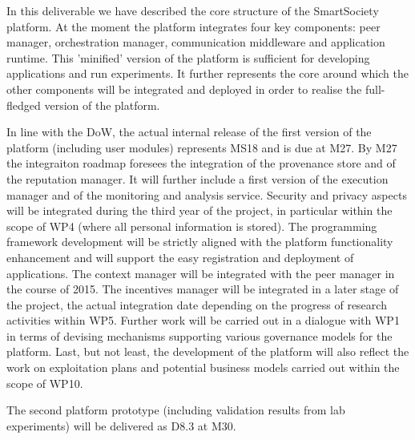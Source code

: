 In this deliverable we have described the core structure of the SmartSociety platform. At the moment the platform integrates four key components: peer manager, orchestration manager, communication middleware and application runtime. This 'minified' version of the platform is sufficient for developing applications and run experiments. It further represents the core around which the other components will be integrated and deployed in order to realise the full-fledged version of the platform. 

In line with the DoW, the actual internal release of the first version of the platform (including user modules) represents MS18 and is due at M27. By M27 the integraiton roadmap foresees the integration of the provenance store and of the reputation manager. It will further include a first version of the execution manager and of the monitoring and analysis service. Security and privacy aspects will be integrated during the third year of the project, in particular within the scope of WP4 (where all personal information is stored). The programming framework development will be strictly aligned with the platform functionality enhancement and will support the easy registration and deployment of applications. The context manager will be integrated with the peer manager in the course of 2015. The incentives manager will be integrated in a later stage of the project, the actual integration date depending on the progress of research activities within WP5. Further work will be carried out in a dialogue with WP1 in terms of devising mechanisms supporting various governance models for the platform. Last, but not least, the development of the platform will also reflect the work on exploitation plans and potential business models carried out within the scope of WP10.

The second platform prototype (including validation results from lab experiments) will be delivered as D8.3 at M30. 


